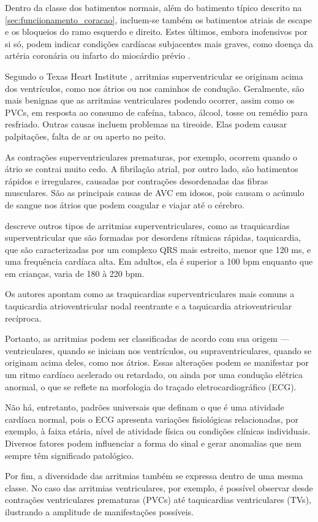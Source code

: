 Dentro da classe dos batimentos normais, além do batimento típico descrito na \ref{sec:funciionamento_coracao}, incluem-se também os batimentos atriais de escape e os bloqueios do ramo esquerdo e direito. Estes últimos, embora inofensivos por si só, podem indicar condições cardíacas subjacentes mais graves, como doença da artéria coronária ou infarto do miocárdio prévio \cite{mitchell2024hisbloqueio}.

Segundo o Texas Heart Institute \cite{texasheart_arrhythmias}, arritmias superventricular se originam acima dos ventrículos, como nos 
átrios ou nos caminhos de condução. Geralmente, são mais benignas que as arritmias ventriculares podendo ocorrer, assim como os PVCs, em 
resposta ao consumo de cafeína, tabaco, álcool, tosse ou remédio para resfriado. Outras causas incluem problemas na tireoide. Elas podem causar
palpitações, falta de ar ou aperto no peito.

As contrações superventriculares prematuras, por exemplo, ocorrem quando o átrio se contrai muito cedo. A fibrilação atrial, por outro lado,
são batimentos rápidos e irregulares, causadas por contrações desordenadas das fibras musculares. São as principais causas de 
AVC em idosos, pois causam o acúmulo de sangue nos átrios que podem coagular e viajar até o cérebro. 

 descreve outros tipos de arritmias superventriculares, como as traquicardias superventricular que são formadas 
por desordens rítmicas rápidas, taquicardia, que são caracterizadas por um complexo QRS mais estreito, menor que 120 ms, e uma 
frequência cardíaca alta. Em adultos, ela é superior a 100 bpm enquanto que em crianças, varia de 180 à 220 bpm. 

Os autores apontam como as traquicardias superventriculares mais comuns a taquicardia atrioventricular nodal reentrante e a taquicardia
atrioventricular recíproca. 

Portanto, as arritmias podem ser classificadas de acordo com sua origem — ventriculares, quando se iniciam nos ventrículos, ou supraventriculares, quando se originam acima deles, como nos átrios.
Essas alterações podem se manifestar por um ritmo cardíaco acelerado ou retardado, ou ainda por uma condução elétrica anormal, o que se reflete na morfologia do traçado eletrocardiográfico (ECG).

Não há, entretanto, padrões universais que definam o que é uma atividade cardíaca normal, pois o ECG apresenta variações fisiológicas relacionadas, por exemplo, à faixa etária, nível de atividade física ou condições clínicas individuais. Diversos fatores podem influenciar a forma do sinal e gerar anomalias que nem sempre têm significado patológico.

Por fim, a diversidade das arritmias também se expressa dentro de uma mesma classe. No caso das arritmias ventriculares, por exemplo, é possível observar desde contrações ventriculares prematuras (PVCs) até taquicardias ventriculares (TVs), ilustrando a amplitude de manifestações possíveis.